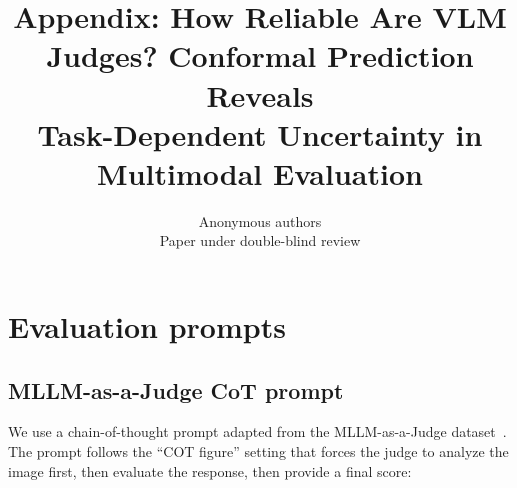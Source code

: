 \documentclass{article}
\title{Appendix: How Reliable Are VLM Judges? Conformal Prediction Reveals \\ Task-Dependent Uncertainty in Multimodal Evaluation}
\author{Anonymous authors\\Paper under double-blind review}
\begin{document}
\maketitle

\appendix

\section{Evaluation prompts}
\label{app:prompts}

\subsection{MLLM-as-a-Judge CoT prompt}

We use a chain-of-thought prompt adapted from the MLLM-as-a-Judge dataset~\citep{chen2024mllmasajudge}. The prompt follows the ``COT figure'' setting that forces the judge to analyze the image first, then evaluate the response, then provide a final score:
\end{document}
